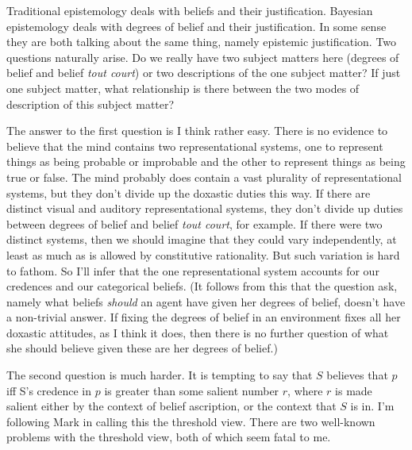 Traditional epistemology deals with beliefs and their justification. Bayesian epistemology deals with degrees of belief and their justification. In some sense they are both talking about the same thing, namely epistemic justification. Two questions naturally arise. Do we really have two subject matters here (degrees of belief and belief \textit{tout court}) or two descriptions of the one subject matter? If just one subject matter, what relationship is there between the two modes of description of this subject matter?

The answer to the first question is I think rather easy. There is no evidence to believe that the mind contains two representational systems, one to represent things as being probable or improbable and the other to represent things as being true or false. The mind probably does contain a vast plurality of representational systems, but they don't divide up the doxastic duties this way. If there are distinct visual and auditory representational systems, they don't divide up duties between degrees of belief and belief \textit{tout court}, for example. If there were two distinct systems, then we should imagine that they could vary independently, at least as much as is allowed by constitutive rationality. But such variation is hard to fathom. So I'll infer that the one representational system accounts for our credences and our categorical beliefs. (It follows from this that the question \cite{Bovens1999} ask, namely what beliefs \textit{should} an agent have given her degrees of belief, doesn't have a non-trivial answer. If fixing the degrees of belief in an environment fixes all her doxastic attitudes, as I think it does, then there is no further question of what she should believe given these are her degrees of belief.) 

The second question is much harder. It is tempting to say that \(S\) believes that \(p\) iff S's credence in \(p\) is greater than some salient number \(r\), where \(r\) is made salient either by the context of belief ascription, or the context that \(S\) is in. I'm following Mark \cite{Kaplan1996} in calling this the threshold view. There are two well-known problems with the threshold view, both of which seem fatal to me.

